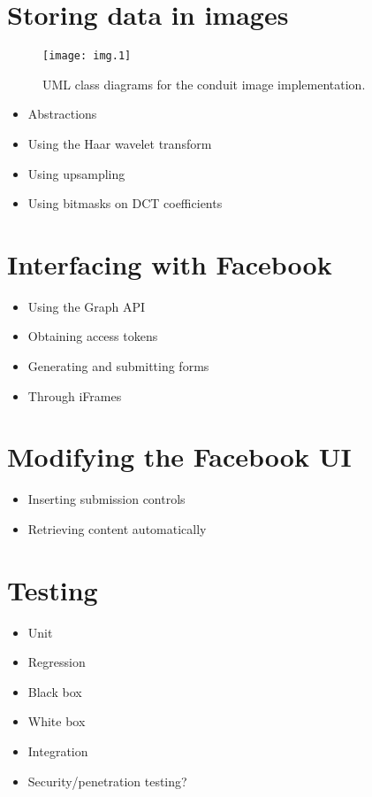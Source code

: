 \section{Storing data in images}

    \begin{figure}[tbp]
        \begin{center}
                \texttt{[image: img.1]}
            \caption{UML class diagrams for the conduit image implementation.}
            \label{uml:img-classes}
        \end{center}
    \end{figure}
    
    \begin{itemize}
        \item Abstractions
        \item Using the Haar wavelet transform
        \item Using upsampling
        \item Using bitmasks on DCT coefficients
    \end{itemize}


\section{Interfacing with Facebook}
    \begin{itemize}
        \item Using the Graph API
        \item Obtaining access tokens
        \item Generating and submitting forms
        \item Through iFrames
    \end{itemize}

\section{Modifying the Facebook UI}
    \begin{itemize}
        \item Inserting submission controls
        \item Retrieving content automatically
    \end{itemize}

\section{Testing}
    \begin{itemize}
        \item Unit
        \item Regression
        \item Black box
        \item White box
        \item Integration
        \item Security/penetration testing?
    \end{itemize}
    
